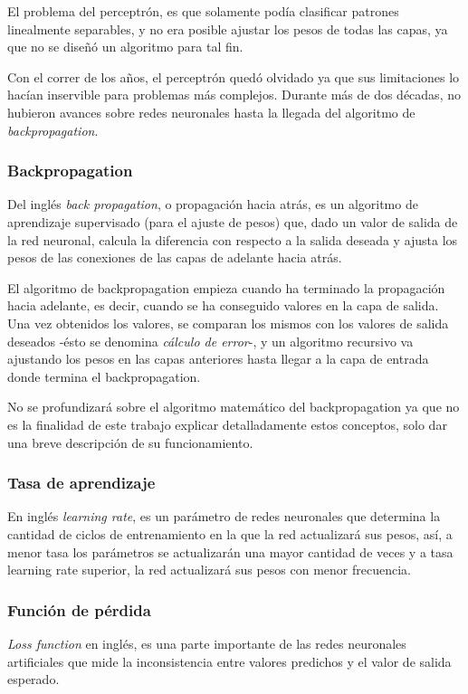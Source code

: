 \documentclass[a4paper,12pt,oneside,spanish]{book}
\begin{document}
El problema del perceptrón, es que solamente podía clasificar patrones linealmente separables, y no era posible ajustar los pesos de todas las capas, ya que no se diseñó un algoritmo para tal fin.\par

Con el correr de los años, el perceptrón quedó olvidado ya que sus limitaciones lo hacían inservible para problemas más complejos. Durante más de dos décadas, no hubieron avances sobre redes neuronales hasta la llegada del algoritmo de \textit{backpropagation}.\par

\subsubsection{Backpropagation}
Del inglés \textit{back propagation}, o propagación hacia atrás, es un algoritmo de aprendizaje supervisado (para el ajuste de pesos) que, dado un valor de salida de la red neuronal, calcula la diferencia con respecto a la salida deseada y ajusta los pesos de las conexiones de las capas de adelante hacia atrás.\par

El algoritmo de backpropagation empieza cuando ha terminado la propagación hacia adelante, es decir, cuando se ha conseguido valores en la capa de salida. Una vez obtenidos los valores, se comparan los mismos con los valores de salida deseados -ésto se denomina \textit{cálculo de error}-, y un algoritmo recursivo va ajustando los pesos en las capas anteriores hasta llegar a la capa de entrada donde termina el backpropagation.\par

No se profundizará sobre el algoritmo matemático del backpropagation ya que no es la finalidad de este trabajo explicar detalladamente estos conceptos, solo dar una breve descripción de su funcionamiento.\par


\subsubsection{Tasa de aprendizaje}
En inglés \textit{learning rate}, es un parámetro de redes neuronales que determina la cantidad de ciclos de entrenamiento en la que la red actualizará sus pesos, así, a menor tasa los parámetros se actualizarán una mayor cantidad de veces y a tasa learning rate superior, la red actualizará sus pesos con menor frecuencia.

\subsubsection{Función de pérdida}
\textit{Loss function} en inglés, es una parte importante de las redes neuronales artificiales que mide la inconsistencia entre valores predichos y el valor de salida esperado. \par
\end{document}

